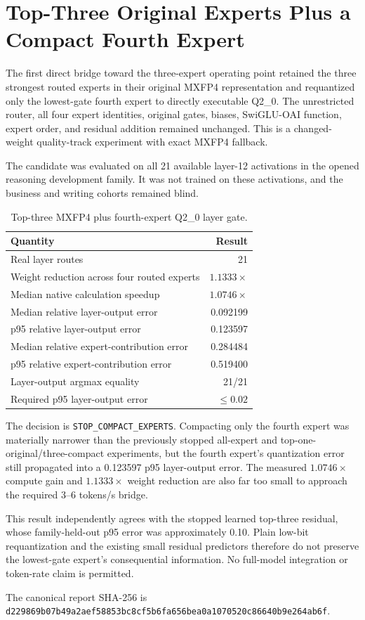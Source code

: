 \section{Top-Three Original Experts Plus a Compact Fourth Expert}
\label{sec:gptoss120b-top3-q2-fourth}

The first direct bridge toward the three-expert operating point retained the
three strongest routed experts in their original MXFP4 representation and
requantized only the lowest-gate fourth expert to directly executable Q2\_0.
The unrestricted router, all four expert identities, original gates, biases,
SwiGLU-OAI function, expert order, and residual addition remained unchanged.
This is a changed-weight quality-track experiment with exact MXFP4 fallback.

The candidate was evaluated on all 21 available layer-12 activations in the
opened reasoning development family.  It was not trained on these activations,
and the business and writing cohorts remained blind.

\begin{table}[ht]
\centering
\caption{Top-three MXFP4 plus fourth-expert Q2\_0 layer gate.}
\begin{tabular}{@{}lr@{}}
\toprule
Quantity & Result \\
\midrule
Real layer routes & 21 \\
Weight reduction across four routed experts & $1.1333\times$ \\
Median native calculation speedup & $1.0746\times$ \\
Median relative layer-output error & 0.092199 \\
p95 relative layer-output error & 0.123597 \\
Median relative expert-contribution error & 0.284484 \\
p95 relative expert-contribution error & 0.519400 \\
Layer-output argmax equality & 21/21 \\
Required p95 layer-output error & $\leq 0.02$ \\
\bottomrule
\end{tabular}
\end{table}

The decision is \texttt{STOP\_COMPACT\_EXPERTS}.  Compacting only the fourth
expert was materially narrower than the previously stopped all-expert and
top-one-original/three-compact experiments, but the fourth expert's quantization
error still propagated into a 0.123597 p95 layer-output error.  The measured
$1.0746\times$ compute gain and $1.1333\times$ weight reduction are also far too
small to approach the required 3--6 tokens/s bridge.

This result independently agrees with the stopped learned top-three residual,
whose family-held-out p95 error was approximately 0.10.  Plain low-bit
requantization and the existing small residual predictors therefore do not
preserve the lowest-gate expert's consequential information.  No full-model
integration or token-rate claim is permitted.

The canonical report SHA-256 is
\texttt{d229869b07b49a2aef58853bc8cf5b6fa656bea0a1070520c86640b9e264ab6f}.

